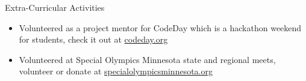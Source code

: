 \documentclass{resume} %
\begin{document}
\begin{rSection}{Extra-Curricular Activities}
\begin{itemize}
    \item 	Volunteered as a project mentor for CodeDay which is a hackathon weekend for students, check it out at \href{https://www.codeday.org/}{codeday.org}
    \item Volunteered at Special Olympics Minnesota state and regional meets, volunteer or donate at \href{https://specialolympicsminnesota.org/}{specialolympicsminnesota.org}
\end{itemize}


\end{rSection}

\end{document}
